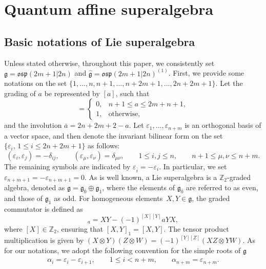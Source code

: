 \documentclass[pdftex]{sigma}
\numberwithin{equation}{section}
\begin{document}
\section{Quantum affine superalgebra}\label{sec2}

\subsection{Basic notations of Lie superalgebra}
 Unless stated otherwise, throughout this paper, we consistently set $\mathfrak{g}=\mathfrak{osp}(2m+1|2n)$ and $\mathfrak{\hat{g}}=\mathfrak{osp}(2m+1|2n)^{(1)}$. First, we provide some notations on the set $\{1,\dots,n,n+1,\dots,n+2m+1,\dots,2n+2m+1\}$. Let the grading of $a$ be represented by $[a]$, such that
\begin{equation*}
 [a]=
 \begin{cases}
 0,&n+1\leq a\leq2m+n+1,\\
 1,& \text{otherwise},
 \end{cases}
\end{equation*}and the involution $\overline{a}=2n+2m+2-a$. Let $\varepsilon_1,\dots,\varepsilon_{n+m}$ is an orthogonal basis of a vector space,
 and then denote the invariant bilinear form on the set $\{\varepsilon_i,\, 1\leq i\leq2n+2m+1\}$ as follows:
\begin{equation*}
 (\varepsilon_i,\varepsilon_j)=-\delta_{ij},\qquad (\varepsilon_\mu,\varepsilon_\nu)=\delta_{\mu\nu}, \qquad 1\leq i,j\leq n,\qquad n+1\leq \mu,\nu\leq n+m.
\end{equation*}
The remaining symbols are indicated by $\varepsilon_{\overline{i}} =-\varepsilon_i$. In particular, we set
${\varepsilon_{n+m+1}=-\varepsilon_{n+m+1}=0}$.
As is well known, a Lie superalgebra is a $\mathbb{Z}_2$-graded algebra, denoted as $\mathfrak{g}=\mathfrak{g}_{\bar{0}}\oplus\mathfrak{g}_{\bar{1}}$, where the elements of $\mathfrak{g}_{\bar{0}}$ are referred to as even, and those of $\mathfrak{g}_{\bar{1}}$ as odd. For homogeneous elements~${X,Y\in \mathfrak{g}}$, the graded commutator is defined as
\begin{equation*}
[X, Y]_{a}=XY-(-1)^{[X][Y]}aYX,
\end{equation*}where $[X]\in \mathbb{Z}_2$,
 ensuring that $[X, Y]_{1}=[X, Y]$.
The tensor product multiplication is given by
$(X\otimes Y)(Z\otimes W)=(-1)^{[Y][Z]}(XZ\otimes YW)$.
 As for our notations, we adopt the following convention for the simple roots of $\mathfrak{g}$
 \begin{align*}
 \alpha_{i}=\varepsilon_i-\varepsilon_{i+1}, \qquad 1\leq i<n+m, \qquad \alpha_{n+m}=\varepsilon_{n+m}.
\end{align*}
\end{document}
